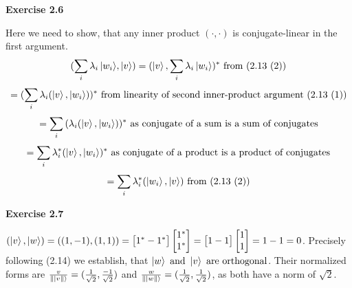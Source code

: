 \documentclass{article}
\begin{document}
\bigskip

\begin{framed}
    \noindent \textbf{Exercise 2.6}
    
    \medskip
    
    Here we need to show, that any inner product $(\cdot, \cdot)$ is conjugate-linear in the first argument.
    $$
    (\sum_{i}{\lambda_i \ket{w_i}}, \ket{v}) = (\ket{v}, \sum_{i}{\lambda_i \ket{w_i}})^{*} \text{ from (2.13 (2))}
    $$
    $$
    = (\sum_{i}{\lambda_i(\ket{v}, \ket{w_i})})^{*} \text{ from linearity of second inner-product argument (2.13 (1))}
    $$
    $$
    = \sum_{i}{(\lambda_i(\ket{v}, \ket{w_i}))^*} \text{ as conjugate of a sum is a sum of conjugates}
    $$
    $$
    = \sum_{i}{\lambda_i^*(\ket{v}, \ket{w_i})^*}  \text{ as conjugate of a product is a product of conjugates}
    $$
    $$
    = \sum_{i}{\lambda_i^*(\ket{w_i}, \ket{v})} \text{ from (2.13 (2))}
    $$
    
\end{framed}

\bigskip

\begin{framed}
    \noindent \textbf{Exercise 2.7}
    
    \medskip
    
    $(\ket{v}, \ket{w}) =  ((1, -1), (1, 1)) = \begin{bmatrix} 1^* -1^* \end{bmatrix} \begin{bmatrix} 1^* \\ 1^* \end{bmatrix} = \begin{bmatrix} 1 -1 \end{bmatrix} \begin{bmatrix} 1 \\ 1 \end{bmatrix} = 1 - 1 = 0$. Precisely following (2.14) we establish, that $\ket{w} \text{ and } \ket{v} \text{ are orthogonal}$. Their normalized forms are $\frac{v}{\| \ket{v \|}} = (\frac{1}{\sqrt{2}}, \frac{-1}{\sqrt{2}})$ and $\frac{w}{\| \ket{w \|}} = (\frac{1}{\sqrt{2}}, \frac{1}{\sqrt{2}})$, as both have a norm of $\sqrt{2}$.
    
\end{framed}

\bigskip
\end{document}
